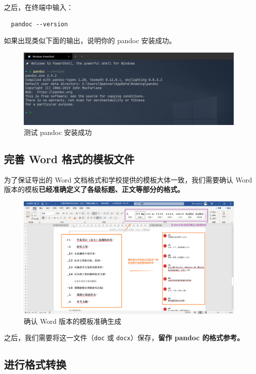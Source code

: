 之后，在终端中输入：
\begin{verbatim}
  pandoc --version
\end{verbatim}

如果出现类似下面的输出，说明你的 pandoc 安装成功。

\begin{figure}[H]
  \centering
  \includegraphics[width=\textwidth]{images/pandoc_test.png}
  \caption{测试 pandoc 安装成功}
  \label{pandoc_test}
\end{figure}

\subsection{完善 Word 格式的模板文件}

为了保证导出的 Word 文档格式和学校提供的模板大体一致，我们需要确认 Word 版本的模板\textbf{已经准确定义了各级标题、正文等部分的格式。}

\begin{figure}[H]
  \center
  \includegraphics[width=\textwidth]{images/latex_pandoc_word.png}
  \caption{确认 Word 版本的模板准确生成}
  \label{latex_pandoc_word}
\end{figure}

之后，我们需要将这一文件（\texttt{doc} 或 \texttt{docx}）保存，\textbf{留作 pandoc 的格式参考。}

\subsection{进行格式转换}

